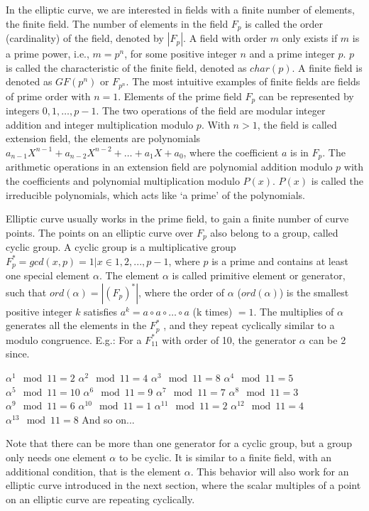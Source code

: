 In the elliptic curve, we are interested in fields with a finite number of elements, the finite field. The number of elements in the field $F_p$ is called the order (cardinality) of the field, denoted by $|F_p|$. A field with order $m$ only exists if $m$ is a prime power, i.e., $m = p^n$, for some positive integer $n$ and a prime integer $p$. $p$ is called the characteristic of the finite field, denoted as $char(p)$. A finite field is denoted as $GF(p^n)$ or $F_{p^n}$. The most intuitive examples of finite fields are fields of prime order with $n = 1$. Elements of the prime field $F_p$ can be represented by integers $0, 1, …, p-1$. The two operations of the field are modular integer addition and integer multiplication modulo $p$. With $n > 1$, the field is called extension field, the elements are polynomials $a_{n-1}X^{n-1} + a_{n-2}X^{n-2} + … + a_1X + a_0$, where the coefficient $a$ is in $F_p$. The arithmetic operations in an extension field are polynomial addition modulo $p$ with the coefficients and polynomial multiplication modulo $P(x)$. $P(x)$ is called the irreducible polynomials, which acts like ‘a prime’ of the polynomials.

Elliptic curve usually works in the prime field, to gain a finite number of curve points. The points on an elliptic curve over $F_p$ also belong to a group, called cyclic group. A cyclic group is a multiplicative group $F_p^* = {gcd(x,p) = 1 | x \in {1, 2, ..., p-1}}$, where $p$ is a prime and contains at least one special element $\alpha$. The element $\alpha$ is called primitive element or generator, such that $ord(\alpha) = |(F_p)^*|$, where the order of $\alpha$ ($ord(\alpha)$) is the smallest positive integer $k$ satisfies $a^k = a \circ a \circ … \circ a$ (k times) $= 1$. The multiplies of $\alpha$ generates all the elements in the $F_p^*$ , and they repeat cyclically similar to a modulo congruence. E.g.: For a $F_{11}^*$ with order of 10, the generator $\alpha$ can be 2 since.

\setlength{\columnsep}{4cm}
\begin{multicols}{2}
  $\alpha^1 \mod 11 = 2$
  $\alpha^2 \mod 11 = 4$
  $\alpha^3 \mod 11 = 8$
  $\alpha^4 \mod 11 = 5$
  $\alpha^5 \mod 11 = 10$
  $\alpha^6 \mod 11 = 9$
  $\alpha^7 \mod 11 = 7$
  $\alpha^8 \mod 11 = 3$
  $\alpha^9 \mod 11 = 6$
  $\alpha^{10} \mod 11 = 1$
  $\alpha^{11} \mod 11 = 2$
  $\alpha^{12} \mod 11 = 4$
  $\alpha^{13} \mod 11 = 8$
  And so on...
\end{multicols}


Note that there can be more than one generator for a cyclic group, but a group only needs one element $\alpha$ to be cyclic. It is similar to a finite field, with an additional condition, that is the element $\alpha$. This behavior will also work for an elliptic curve introduced in the next section, where the scalar multiples of a point on an elliptic curve are repeating cyclically.

